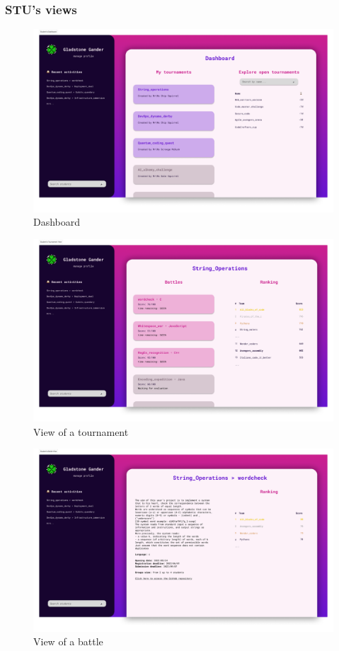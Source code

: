 \subsubsection*{STU's views}
\begin{figure}[H]
    \centering
    \includegraphics[width=1\textwidth]{images/user_interfaces/student_dashboard.png}
    \caption{Dashboard}
\end{figure}
\begin{figure}[H]
    \centering
    \includegraphics[width=1\textwidth]{images/user_interfaces/student_tournament_view.png}
    \caption{View of a tournament}
\end{figure}
\begin{figure}[H]
    \centering
    \includegraphics[width=1\textwidth]{images/user_interfaces/student_battle_view.png}
    \caption{View of a battle}
\end{figure}

